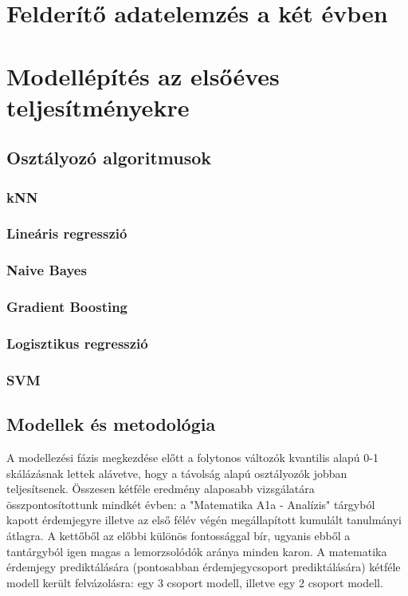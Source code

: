 \documentclass[12pt]{article}
\begin{document}
\section{Felderítő adatelemzés a két évben}


\section{Modellépítés az elsőéves teljesítményekre}

\subsection{Osztályozó algoritmusok}

\subsubsection{kNN}

\subsubsection{Lineáris regresszió}

\subsubsection{Naive Bayes}

\subsubsection{Gradient Boosting}

\subsubsection{Logisztikus regresszió}

\subsubsection{SVM}


\subsection{Modellek és metodológia}

A modellezési fázis megkezdése előtt a folytonos változók kvantilis alapú 0-1 skálázásnak lettek alávetve, hogy a távolság alapú osztályozók jobban teljesítsenek. Összesen kétféle eredmény alaposabb vizsgálatára összpontosítottunk mindkét évben: a "Matematika A1a - Analízis" tárgyból kapott érdemjegyre illetve az első félév végén megállapított kumulált tanulmányi átlagra. A kettőből az előbbi különös fontossággal bír, ugyanis ebből a tantárgyból igen magas a lemorzsolódók aránya minden karon. A matematika érdemjegy prediktálására (pontosabban érdemjegycsoport prediktálására) kétféle modell került felvázolásra: egy 3 csoport modell, illetve egy 2 csoport modell.
\end{document}
